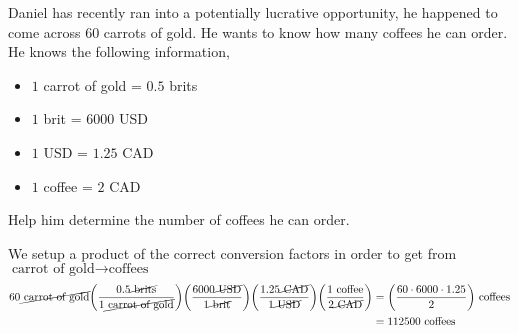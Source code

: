 \documentclass[11pt]{article} %
\begin{document}
\begin{qstn}[3]
Daniel has recently ran into a potentially lucrative opportunity, he happened to come across $60$ carrots of gold. He wants to know how many coffees he can order. He knows the following information, 
\begin{itemize}
\item $1$ carrot of gold = $0.5$ brits
\item $1$ brit = $6000$ USD
\item $1$ USD = $1.25$ CAD
\item $1$ coffee = $2$ CAD
\end{itemize}
Help him determine the number of coffees he can order.


\begin{soln}
We setup a product of the correct conversion factors in order to get from $ \text{carrot of gold} \rightarrow \text{coffees}$
\begin{align*}
 60 \cancel{\text{ carrot of gold}} \left(\frac{0.5 \cancel{\text{ brits}}}{1 \cancel{\text{ carrot of gold}}} \right)\left(\frac{6000 \cancel{\text{ USD}}}{1 \cancel{\text{ brit}}} \right) \left(\frac{1.25 \cancel{\text{ CAD}}}{1 \cancel{\text{ USD}}} \right) \left(\frac{1 \text{ coffee}}{2 \cancel{\text{ CAD}}} \right) &= \left(\frac{60 \cdot 6000 \cdot 1.25}{2} \right)\text{ coffees} \\ &= 112500 \text{ coffees}
\end{align*}



\end{soln}



\end{qstn}
\end{document}
